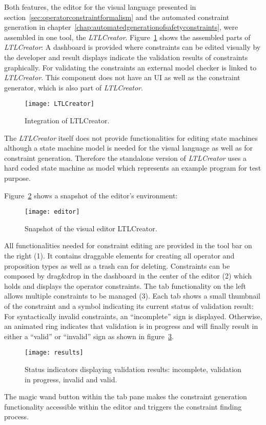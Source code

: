 Both features, the editor for the visual language presented in section~\ref{sec:operatorconstraintformalism} and the automated constraint generation in chapter~\ref{chap:automatedgenerationofsafetyconstraints}, were assembled in one tool, the \emph{LTLCreator}.
Figure~\ref{fig:LTLCreator} shows the assembled parts of \emph{LTLCreator}: A dashboard is provided where constraints can be edited visually by the developer and result displays indicate the validation results of constraints graphically. For validating the constraints an external model checker is linked to \emph{LTLCreator}. This component does not have an UI as well as the constraint generator, which is also part of \emph{LTLCreator}. 
\begin{figure}[htbp]
  \centering
  \texttt{[image: LTLCreator]}
  \caption{Integration of LTLCreator.}
  \label{fig:LTLCreator}
\end{figure}
The \emph{LTLCreator} itself does not provide functionalities for editing state machines although a state machine model is needed for the visual language as well as for constraint generation. Therefore the standalone version of \emph{LTLCreator} uses a hard coded state machine as model which represents an example program for test purpose.

Figure~\ref{fig:editor} shows a snapshot of the editor's environment:
\begin{figure}[htbp]
  \centering
  \texttt{[image: editor]} 
  \caption{Snapshot of the visual editor LTLCreator.}
  \label{fig:editor}
\end{figure}
All functionalities needed for constraint editing are provided in the tool bar on the right (1). It contains draggable elements for creating all operator and proposition types as well as a trash can for deleting. Constraints can be composed by drag\&drop in the dashboard in the center of the editor (2) which holds and displays the operator constraints. The tab functionality on the left allows multiple constraints to be managed (3). Each tab shows a small thumbnail of the constraint and a symbol indicating its current status of validation result: For syntactically invalid constraints, an ``incomplete'' sign is displayed. Otherwise, an animated ring indicates that validation is in pro\-gress and will finally result in either a ``valid'' or ``invalid'' sign as shown in figure~\ref{fig:results}.
\begin{figure}[htbp]
  \centering
  \texttt{[image: results]}
  \caption{Status indicators displaying validation results: incomplete, validation in pro\-gress, invalid and valid.}
  \label{fig:results}
\end{figure}
The magic wand button within the tab pane makes the constraint generation functionality accessible within the editor and triggers the constraint finding process.



